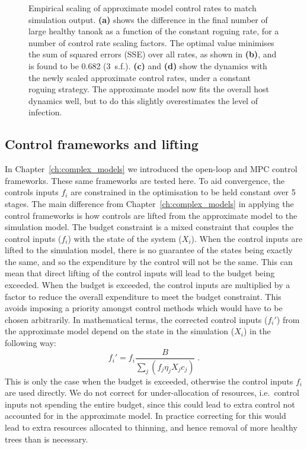 \begin{figure}[t!]
    \begin{center}
        \caption[Scaling of control rates]{Empirical scaling of approximate model control rates to match simulation output. \textbf{(a)} shows the difference in the final number of large healthy tanoak as a function of the constant roguing rate, for a number of control rate scaling factors. The optimal value minimises the sum of squared errors (SSE) over all rates, as shown in \textbf{(b)}, and is found to be \num{0.682} (3~s.f.). \textbf{(c)} and \textbf{(d)} show the dynamics with the newly scaled approximate control rates, under a constant roguing strategy. The approximate model now fits the overall host dynamics well, but to do this slightly overestimates the level of infection.\label{fig:ch6:control_scaling}}
    \end{center}
\end{figure}

\subsection{Control frameworks and lifting}\label{sec:ch6:lifting}

In Chapter~\ref{ch:complex_models} we introduced the open-loop and MPC control frameworks. These same frameworks are tested here. To aid convergence, the controls inputs $f_i$ are constrained in the optimisation to be held constant over \SI{5}{\year} stages. The main difference from Chapter~\ref{ch:complex_models} in applying the control frameworks is how controls are lifted from the approximate model to the simulation model. The budget constraint is a mixed constraint that couples the control inputs ($f_i$) with the state of the system ($X_i$). When the control inputs are lifted to the simulation model, there is no guarantee of the states being exactly the same, and so the expenditure by the control will not be the same. This can mean that direct lifting of the control inputs will lead to the budget being exceeded. When the budget is exceeded, the control inputs are multiplied by a factor to reduce the overall expenditure to meet the budget constraint. This avoids imposing a priority amongst control methods which would have to be chosen arbitrarily. In mathematical terms, the corrected control inputs ($f_i'$) from the approximate model depend on the state in the simulation ($X_i$) in the following way:
\begin{equation}
    f_i' = f_i\frac{B}{\sum_j\left(f_j\eta_jX_jc_j\right)}\;.
\end{equation}
This is only the case when the budget is exceeded, otherwise the control inputs $f_i$ are used directly. We do not correct for under-allocation of resources, i.e.\ control inputs not spending the entire budget, since this could lead to extra control not accounted for in the approximate model. In practice correcting for this would lead to extra resources allocated to thinning, and hence removal of more healthy trees than is necessary.


